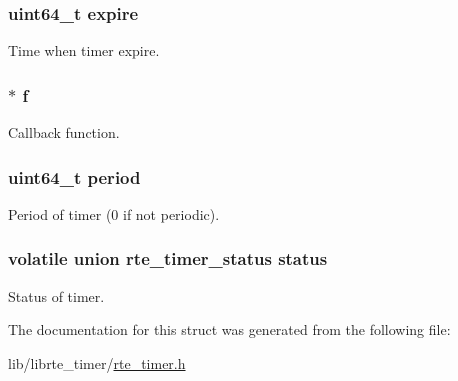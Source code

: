 \subsubsection[{expire}]{\setlength{\rightskip}{0pt plus 5cm}uint64\+\_\+t expire}\label{structrte__timer_ac9ce2fcaa610ae415e9e65d1d7b48ba2}
Time when timer expire. \hypertarget{structrte__timer_a58ec0649f525a9e30a03e7559a111538}{}
\subsubsection[{f}]{$\ast$ f}\label{structrte__timer_a58ec0649f525a9e30a03e7559a111538}
Callback function. \hypertarget{structrte__timer_a473ee3fcea196f6207eeda1e747746e8}{}
\subsubsection[{period}]{\setlength{\rightskip}{0pt plus 5cm}uint64\+\_\+t period}\label{structrte__timer_a473ee3fcea196f6207eeda1e747746e8}
Period of timer (0 if not periodic). \hypertarget{structrte__timer_a3be7bdbca383565f03e859db2f37a0a2}{}
\subsubsection[{status}]{\setlength{\rightskip}{0pt plus 5cm}volatile union {\bf rte\+\_\+timer\+\_\+status} status}\label{structrte__timer_a3be7bdbca383565f03e859db2f37a0a2}
Status of timer. 

The documentation for this struct was generated from the following file\+:\begin{DoxyCompactItemize}
\item 
lib/librte\+\_\+timer/\hyperlink{rte__timer_8h}{rte\+\_\+timer.\+h}\end{DoxyCompactItemize}
